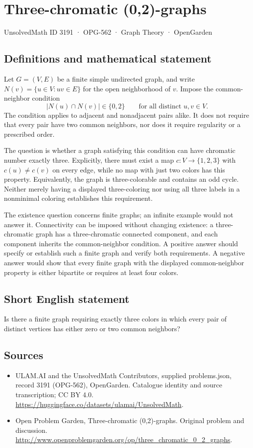 \documentclass[11pt,a4paper]{article}
\begin{document}
\section*{Three-chromatic (0,2)-graphs}\label{3191}
{\small UnsolvedMath ID 3191 · OPG-562 · Graph Theory · OpenGarden}
\subsection{Definitions and mathematical statement}
Let $G=(V,E)$ be a finite simple undirected graph, and write $N(v)=\{u\in V:uv\in E\}$ for the open neighborhood of $v$. Impose the common-neighbor condition
\[
         |N(u)\cap N(v)|\in\{0,2\}
         \qquad\text{for all distinct }u,v\in V.
\]
The condition applies to adjacent and nonadjacent pairs alike. It does not require that every pair have two common neighbors, nor does it require regularity or a prescribed order.

The question is whether a graph satisfying this condition can have chromatic number exactly three. Explicitly, there must exist a map $c:V\to\{1,2,3\}$ with $c(u)\ne c(v)$ on every edge, while no map with just two colors has this property. Equivalently, the graph is three-colorable and contains an odd cycle. Neither merely having a displayed three-coloring nor using all three labels in a nonminimal coloring establishes this requirement.

The existence question concerns finite graphs; an infinite example would not answer it. Connectivity can be imposed without changing existence: a three-chromatic graph has a three-chromatic connected component, and each component inherits the common-neighbor condition. A positive answer should specify or establish such a finite graph and verify both requirements. A negative answer would show that every finite graph with the displayed common-neighbor property is either bipartite or requires at least four colors.
\subsection{Short English statement}
Is there a finite graph requiring exactly three colors in which every pair of distinct vertices has either zero or two common neighbors?
\subsection{Sources}
\begin{itemize}
\item[S1] ULAM.AI and the UnsolvedMath Contributors, supplied problems.json, record 3191 (OPG-562), OpenGarden. Catalogue identity and source transcription; CC BY 4.0.
\url{https://huggingface.co/datasets/ulamai/UnsolvedMath}.
\item[S2] Open Problem Garden, Three-chromatic (0,2)-graphs. Original problem and discussion.
\url{http://www.openproblemgarden.org/op/three_chromatic_0_2_graphs}.
\end{itemize}
\end{document}
